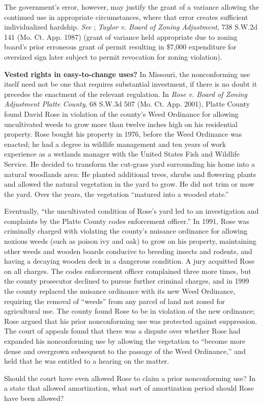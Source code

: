 The government's error, however, may justify the grant of a variance allowing
the continued use in appropriate circumstances, where that error creates
sufficient individualized hardship. \textit{See}
; \emph{Taylor v. Board of Zoning Adjustment}, 738
S.W.2d 141 (Mo. Ct. App. 1987) (grant of variance held appropriate due to zoning
board's prior erroneous grant of permit resulting in \$7,000 expenditure for
oversized sign later subject to permit revocation for zoning violation).

\item
\textbf{Vested rights in easy-to-change uses?} In Missouri, the nonconforming
use itself need not be one that requires substantial investment, if there is no
doubt it precedes the enactment of the relevant regulation. In \textit{Rose v.
Board of Zoning Adjustment Platte County}, 68 S.W.3d 507 (Mo. Ct. App. 2001),
Platte County found David Rose in violation of the county's Weed Ordinance for
allowing uncultivated weeds to grow more than twelve inches high on his
residential property. Rose bought his property in 1976, before the Weed
Ordinance was enacted; he had a degree in wildlife management and ten years of
work experience as a wetlands manager with the United States Fish and Wildlife
Service. He decided to transform the cut-grass yard surrounding his home into a
natural woodlands area: He planted additional trees, shrubs and flowering plants
and allowed the natural vegetation in the yard to grow. He did not trim or mow
the yard. Over the years, the vegetation ``matured into a wooded state.'' 

Eventually, ``the uncultivated condition of Rose's yard led to an investigation
and complaints by the Platte County codes enforcement officer.'' In 1991, Rose
was criminally charged with violating the county's nuisance ordinance for
allowing noxious weeds (such as poison ivy and oak) to grow on his property,
maintaining other weeds and wooden boards conducive to breeding insects and
rodents, and having a decaying wooden deck in a dangerous condition. A jury
acquitted Rose on all charges. The codes enforcement officer complained three
more times, but the county prosecutor declined to pursue further criminal
charges, and in 1999 the county replaced the nuisance ordinance with its new
Weed Ordinance, requiring the removal of ``weeds'' from any parcel of land not
zoned for agricultural use. The county found Rose to be in violation of the new
ordinance; Rose argued that his prior nonconforming use was protected against
suppression. The court of appeals found that there was a dispute over whether
Rose had expanded his nonconforming use by allowing the vegetation to ``become
more dense and overgrown subsequent to the passage of the Weed Ordinance,'' and
held that he was entitled to a hearing on the matter.

Should the court have even allowed Rose to claim a prior nonconforming use? In a
state that allowed amortization, what sort of amortization period should Rose
have been allowed?

